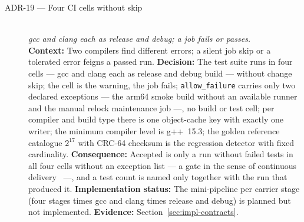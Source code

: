 \begin{description}
  \item[ADR-19 --- Four CI cells without skip]\hfill\\
  \emph{gcc and clang each as release and debug; a job fails or passes.}\hfill\\
  \textbf{Context:} Two compilers find different errors; a silent job skip or a tolerated error
  feigns a passed run.
  \textbf{Decision:} The test suite runs in four cells --- gcc and clang each as release and debug
  build --- without change skip; the cell is the warning, the job fails; \texttt{allow\_failure}
  carries only two declared exceptions --- the arm64 smoke build without an available runner and
  the manual relock maintenance job ---, no build or test cell; per compiler and build type there
  is one object-cache key with exactly one writer; the minimum compiler level is g++~15.3; the
  golden reference catalogue $2^{17}$ with CRC-64 checksum is the regression detector with fixed
  cardinality.
  \textbf{Consequence:} Accepted is only a run without failed tests in all four cells without an
  exception list --- a gate in the sense of continuous delivery~\cite{humble2010cd} ---, and a
  test count is named only together with the run that produced it.
  \textbf{Implementation status:} The mini-pipeline per carrier stage (four stages times gcc and
  clang times release and debug) is planned but not implemented.
  \textbf{Evidence:} Section~\ref{sec:impl-contracts}.


\end{description}
